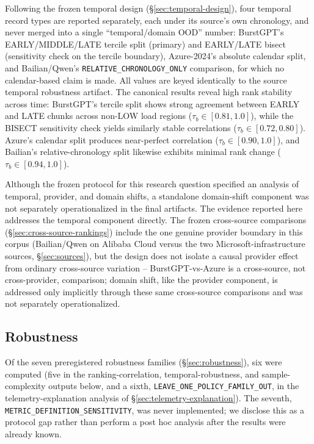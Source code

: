 Following the frozen temporal design (\S\ref{sec:temporal-design}), four
temporal record types are reported separately, each under its source's own
chronology, and never merged into a single ``temporal/domain OOD'' number:
BurstGPT's EARLY/MIDDLE/LATE tercile split (primary) and EARLY/LATE bisect
(sensitivity check on the tercile boundary), Azure-2024's absolute calendar
split, and Bailian/Qwen's \texttt{RELATIVE\_CHRONOLOGY\_ONLY} comparison,
for which no calendar-based claim is made. All values are keyed identically
to the source temporal robustness artifact. The canonical results reveal high rank stability across time: BurstGPT's tercile split shows strong agreement between EARLY and LATE chunks across non-LOW load regions ($\tau_b \in [0.81, 1.0]$), while the BISECT sensitivity check yields similarly stable correlations ($\tau_b \in [0.72, 0.80]$). Azure's calendar split produces near-perfect correlation ($\tau_b \in [0.90, 1.0]$), and Bailian's relative-chronology split likewise exhibits minimal rank change ($\tau_b \in [0.94, 1.0]$).

Although the frozen protocol for this research question specified an analysis of temporal, provider, and domain shifts, a standalone domain-shift component was not separately operationalized in the final artifacts. The evidence reported here addresses the temporal component directly. The frozen cross-source comparisons (\S\ref{sec:cross-source-rankings}) include the one genuine provider boundary in this corpus (Bailian/Qwen on Alibaba Cloud versus the two Microsoft-infrastructure sources, \S\ref{sec:sources}), but the design does not isolate a causal provider effect from ordinary cross-source variation -- BurstGPT-vs-Azure is a cross-source, not cross-provider, comparison; domain shift, like the provider component, is addressed only implicitly through these same cross-source comparisons and was not separately operationalized.

\subsection{Robustness}
\label{sec:results-robustness}

Of the seven preregistered robustness families (\S\ref{sec:robustness}), six were computed (five in the ranking-correlation, temporal-robustness, and sample-complexity outputs below, and a sixth, \texttt{LEAVE\_ONE\_POLICY\_FAMILY\_OUT}, in the telemetry-explanation analysis of \S\ref{sec:telemetry-explanation}). The seventh, \texttt{METRIC\_DEFINITION\_SENSITIVITY}, was never implemented; we disclose this as a protocol gap rather than perform a post hoc analysis after the results were already known.


